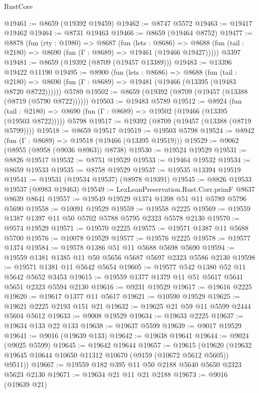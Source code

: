 \begin{lexlean}{RustCore}
\begin{coremodule}
@19461 := @8659 (@19392 @19459)
@19462 := @8747 @5572
@19463 := @19417 @19462
@19464 := @8731 @19463
@19466 := @8659 (@19464 @8752)
@19477 := @8878
    (fun (rty : @1980) =>
    @8687
      (fun (lets : @8686) =>
      @8688 (fun (tail : @2180) => @8690 (fun (Γ : @8689) => @19461 (@19466 @19427)))))
    @3397
@19481 := @8659 (@19392 (@8709 (@19457 @13389)))
@19483 := @13396 @19422 @11190
@19495 := @8900
    (fun (lets : @8686) =>
    @8688
      (fun (tail : @2180) =>
      @8690 (fun (Γ : @8689) => @19481 (@19466 (@13395 (@19483 @8720 @8722))))))
    @5789
@19502 := @8659 (@19392 (@8709 (@19457 (@13388 (@8719 (@5790 @8722))))))
@19503 := @19483 @5789
@19512 := @8924
    (fun (tail : @2180) => @8690 (fun (Γ : @8689) => @19502 (@19466 (@13395 (@19503 @8722)))))
    @5798
@19517 := @19392 (@8709 (@19457 (@13388 (@8719 @5799))))
@19518 := @8659 @19517
@19519 := @19503 @5798
@19524 := @8942 (fun (Γ : @8689) => @19518 (@19466 (@13395 @19519)))
@19529 := @9062 (@8955 (@8958 (@9036 @8963)) @8738)
@19530 := @19524 @19529
@19531 := @8826 @19517
@19532 := @8751 @19529
@19533 := @19464 @19532
@19534 := @8659 @19533
@19535 := @8758 @19529
@19537 := @19535 @13394 @19519
@19541 := @19531 (@19534 @19537) (@8978 @19391)
@19545 := @8826 @19533 @19537 (@8983 @19463)
@19549 := LexLeanPreservation.Rust.Corr.primF @8637 @8639 @8641
@19557 := @19549 @19529 @1374 @1398 @51 @11 @5789 @5796 @5690
@19558 := @10091 @19529
@19559 := @19558 @2225
@19569 := @19559 @1387 @1397 @11 @50 @5702 @5788 @5795 @2323 @5578 @2130
@19570 := @9574 @19529
@19571 := @19570 @2225
@19575 := @19571 @1387 @11 @5688 @5700
@19576 := @10078 @19529
@19577 := @19576 @2225
@19578 := @19577 @1374
@19584 := @19578 @1386 @51 @11 @5688 @5698 @5690
@19594 := @19559 @1381 @1385 @11 @50 @5656 @5687 @5697 @2323 @5586 @2130
@19598 := @19571 @1381 @11 @5642 @5654
@19605 := @19577 @542 @1380 @52 @11 @5642 @5652 @3453
@19615 := @19559 @1377 @1379 @11 @51 @5617 @5641 @5651 @2323 @5594 @2130
@19616 := @9231 @19529
@19617 := @19616 @2225
@19620 := @19617 @1377 @11 @5617
@19621 := @10590 @19529
@19625 := @19621 @2225 @2193 @151 @21
@19632 := @19625 @21 @59 @11 @5599 @2444 @5604 @5612
@19633 := @9008 @19529
@19634 := @19633 @2225
@19637 := @19634 @133 @22 @133
@19638 := @19637 @5599
@19639 := @9017 @19529
@19641 := @9016 (@19639 @133)
@19642 := @19638 @19641
@19644 := @9024 (@9025 @5599)
@19645 := @19642 @19644
@19657 := @19615
    (@19620 (@19632 @19645 @10644 @10650 @11312 @10670 (@9159 (@10672 @5612 @5605)) @9511))
@19667 := @19559 @182 @395 @11 @50 @2188 @5640 @5650 @2323 @5623 @2130
@19671 := @19634 @21 @11 @21 @2188
@19673 := @9016 (@19639 @21)

\end{coremodule}
\end{lexlean}
